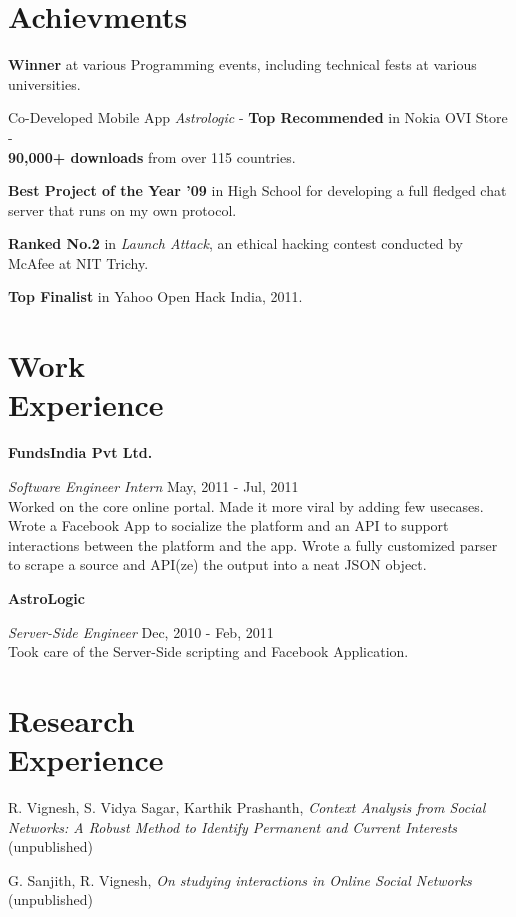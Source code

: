 \begin{resume}
		\section{\sc Achievments}
			\begin{list2}
				\item \textbf{\textsf{Winner}} at various Programming events, including technical fests at various universities.
				\medskip
				\item Co-Developed Mobile App \emph{Astrologic} - \textbf{\textsf{Top Recommended}} in Nokia OVI Store - \\\textbf{\textsf{90,000+ downloads}} from over 115 countries.
				\medskip
				\item \textbf{\textsf{Best Project of the Year '09}} in High School for developing a full fledged chat server that runs on my own protocol.
				\medskip
				\item \textbf{\textsf{Ranked No.2}} in \emph{Launch Attack}, an ethical hacking contest conducted by McAfee at NIT Trichy.
				\medskip
				\item \textbf{\textsf{Top Finalist}} in Yahoo Open Hack India, 2011.
			\end{list2}
		
		\section{\sc Work \\Experience}
			{\bf \textsf{FundsIndia Pvt Ltd.}}
			 
			 \vspace{-.3cm}
			{\em Software Engineer Intern} \hfill May, 2011 - Jul, 2011\\
			Worked on the core online portal. Made it more viral by adding few usecases. 
			Wrote a Facebook App to socialize the platform and an API to support interactions between the platform and the app. 
			Wrote a fully customized parser to scrape a source and API(ze) the output into a neat JSON object.
			
			{\bf \textsf{AstroLogic}}		
		 	
		 	\vspace{-.3cm}
			{\em Server-Side Engineer} \hfill Dec, 2010 - Feb, 2011\\
			Took care of the Server-Side scripting and Facebook Application.

		\section{\sc Research \\Experience}
			\begin{list2}
				\item R. Vignesh, S. Vidya Sagar, Karthik Prashanth, \emph{Context Analysis from Social Networks: A Robust Method to Identify Permanent and Current Interests} \qquad (unpublished)
				\medskip
				\item G. Sanjith, R. Vignesh, \emph{On studying interactions in Online Social Networks} \qquad (unpublished)
			\end{list2}
		

\end{resume}
